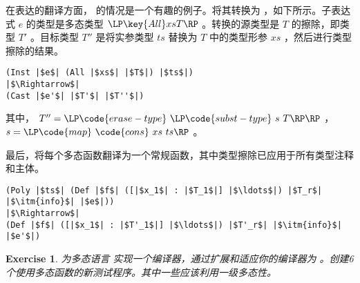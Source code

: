 \documentclass[11pt]{book}
\newtheorem{exercise}[theorem]{Exercise}
\begin{document}
在表达的翻译方面，  的情况是一个有趣的例子。将其转换为  ，如下所示。子表达式 $e$ 的类型是多态类型
$\LP\key{All} xs T\RP$ 。转换的源类型是
$T$ 的擦除，即类型 $T'$ 。目标类型 $T''$ 是将实参类型 $ts$ 替换为 $T$ 中的类型形参 $xs$ ，然后进行类型擦除的结果。
\begin{lstlisting}
(Inst |$e$| (All |$xs$| |$T$|) |$ts$|)
|$\Rightarrow$|
(Cast |$e'$| |$T'$| |$T''$|)
\end{lstlisting}
其中， $T'' = \LP\code{erase-type}~\LP\code{subst-type}~s~T\RP\RP$
， $s = \LP\code{map}~\code{cons}~xs~ts\RP$ 。

最后，将每个多态函数翻译为一个常规函数，其中类型擦除已应用于所有类型注释和主体。
\begin{lstlisting}
(Poly |$ts$| (Def |$f$| ([|$x_1$| : |$T_1$|] |$\ldots$|) |$T_r$| |$\itm{info}$| |$e$|))
|$\Rightarrow$|          
(Def |$f$| ([|$x_1$| : |$T'_1$|] |$\ldots$|) |$T'_r$| |$\itm{info}$| |$e'$|)
\end{lstlisting}

\begin{exercise}\normalfont
  为多态语言 \LangPoly{} 实现一个编译器，通过扩展和适应你的编译器为 \LangGrad{} 。创建6个使用多态函数的新测试程序。其中一些应该利用一级多态性。
\end{exercise}
\end{document}
